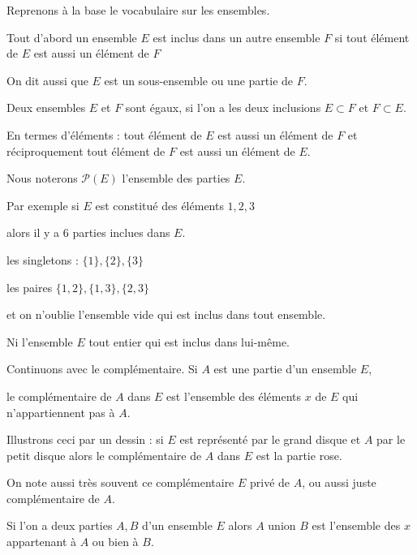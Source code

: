 \diapo

Reprenons à la base le vocabulaire sur les ensembles.

Tout d'abord un ensemble $E$ est inclus dans un autre ensemble $F$
si tout élément de $E$ est aussi un élément de $F$

\change

On dit aussi que $E$ est un sous-ensemble ou une partie de $F$.

\change

Deux ensembles $E$ et $F$ sont égaux, si l'on a les deux inclusions
$E \subset F$ et $F \subset E$.

En termes d'éléments : tout élément de $E$ est aussi un élément de $F$
et réciproquement tout élément de $F$ est aussi un élément de $E$.

\change

Nous noterons $\mathcal{P}(E)$ l'ensemble des parties $E$.

\change

Par exemple si $E$ est constitué des éléments $1,2,3$

alors il y a $6$ parties inclues dans $E$.

les singletons :  $\{1\}, \{2\}, \{3\}$

les paires $\{1,2\}, \{1,3\}, \{2,3\}$

et on n'oublie l'ensemble vide qui est inclus dans tout ensemble.

Ni l'ensemble $E$ tout entier qui est inclus dans lui-même.




\diapo

Continuons avec le complémentaire. Si $A$ est une partie d'un ensemble $E$,

le complémentaire de $A$ dans $E$ est l'ensemble des éléments $x$ de $E$ qui n'appartiennent
pas à $A$.

\change

Illustrons ceci par un dessin : si $E$ est représenté par le grand disque 
et $A$ par le petit disque alors le complémentaire de $A$ dans $E$ est la partie rose.

\change

On note aussi très souvent ce complémentaire $E$ privé de $A$, ou aussi juste complémentaire
de $A$.

\change

Si l'on a deux parties $A, B$ d'un ensemble $E$ alors 
$A$ union $B$ est l'ensemble des $x$ appartenant à $A$ ou bien à $B$.

